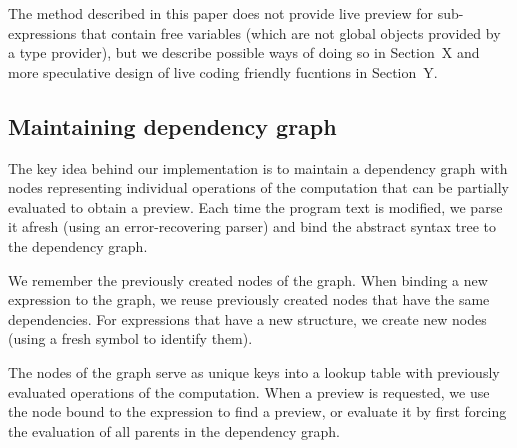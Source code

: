 \documentclass[sigplan,10pt]{acmart}\settopmatter{printfolios=true,printccs=false,printacmref=false}
\begin{document}
The method described in this paper does not provide live preview for sub-expressions that
contain free variables (which are not global objects provided by a type provider), but we
describe possible ways of doing so in Section~X and more speculative design of live coding 
friendly fucntions in Section~Y.


\subsection{Maintaining dependency graph}
\label{sec:formal-deps}

The key idea behind our implementation is to maintain a dependency graph with nodes 
representing individual operations of the computation that can be partially evaluated
to obtain a preview. Each time the program text is modified, we parse it afresh (using an
error-recovering parser) and bind the abstract syntax tree to the dependency graph.

We remember the previously created nodes of the graph. When binding a new expression to
the graph, we reuse previously created nodes that have the same dependencies. For
expressions that have a new structure, we create new nodes (using a fresh symbol to 
identify them). 

The nodes of the graph serve as unique keys into a lookup table with previously
evaluated operations of the computation. When a preview is requested, we use the node
bound to the expression to find a preview, or evaluate it by first forcing the evaluation 
of all parents in the dependency graph.


\end{document}
